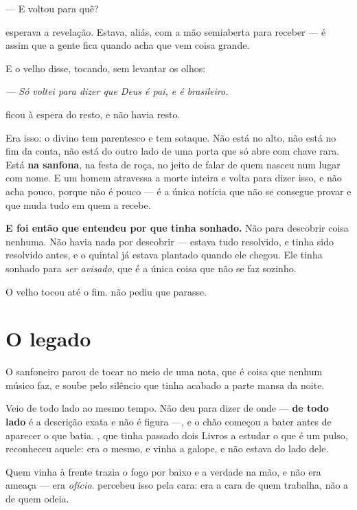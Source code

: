 \documentclass[livro.tex]{subfiles}
\begin{document}
\medskip
\noindent --- E voltou para quê?

\medskip
\noindent \Ben esperava a revelação. Estava, aliás, com a mão semiaberta para
receber --- é assim que a gente fica quando acha que vem coisa grande.

E o velho disse, tocando, sem levantar os olhos:

\begin{center}
\emph{--- Só voltei para dizer que Deus é pai, e é brasileiro.}
\end{center}

\medskip
\noindent \Ben ficou à espera do resto, e não havia resto.

\medskip
\noindent Era isso: o divino tem parentesco e tem sotaque. Não está no alto,
não está no fim da conta, não está do outro lado de uma porta que só abre com
chave rara. Está \textbf{na sanfona}, na festa de roça, no jeito de falar de
quem nasceu num lugar com nome. E um homem atravessa a morte inteira e volta
para dizer isso, e não acha pouco, porque não é pouco --- é a única notícia que
não se consegue provar e que muda tudo em quem a recebe.

\medskip
\noindent \textbf{E foi então que \Ben entendeu por que tinha sonhado.} Não
para descobrir coisa nenhuma. Não havia nada por descobrir --- estava tudo
resolvido, e tinha sido resolvido antes, e o quintal já estava plantado quando
ele chegou. Ele tinha sonhado para \emph{ser avisado}, que é a única coisa que
não se faz sozinho.

\medskip
\noindent O velho tocou até o fim. \Ben não pediu que parasse.

\chapter{O legado}

O sanfoneiro parou de tocar no meio de uma nota, que é coisa que nenhum músico
faz, e \Ben soube pelo silêncio que tinha acabado a parte mansa da noite.

\medskip
\noindent Veio de todo lado ao mesmo tempo. Não deu para dizer de onde ---
\textbf{de todo lado} é a descrição exata e não é figura ---, e o chão começou a
bater antes de aparecer o que batia. \Ben , que tinha passado dois Livros a
estudar o que é um pulso, reconheceu aquele: era o mesmo, e vinha a galope, e
não estava do lado dele.

\medskip
\noindent Quem vinha à frente trazia o fogo por baixo e a verdade na mão, e não
era ameaça --- era \emph{ofício}. \Ben percebeu isso pela cara: era a cara de
quem trabalha, não a de quem odeia.
\end{document}
